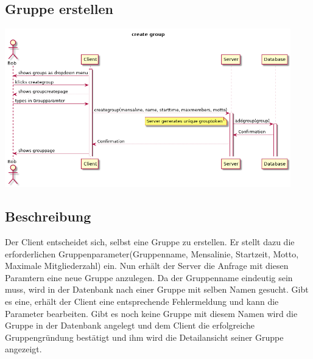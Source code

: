 \documentclass[a4paper]{scrreprt}
\begin{document}
\subsection{Gruppe erstellen}
\begin{center}
\includegraphics[width=0.93\textwidth]{Sequenzdiagramme/CreateGroup}

\end{center}
\subsection*{Beschreibung}
Der Client entscheidet sich, selbst eine Gruppe zu erstellen. Er stellt dazu die erforderlichen Gruppenparameter(Gruppenname, Mensalinie, Startzeit, Motto, Maximale Mitgliederzahl) ein. Nun erhält der Server die Anfrage mit diesen Paramtern eine neue Gruppe anzulegen. Da der Gruppenname eindeutig sein muss, wird in der Datenbank nach einer Gruppe mit selben Namen gesucht. Gibt es eine, erhält der Client eine entsprechende Fehlermeldung und kann die Parameter bearbeiten. Gibt es noch keine Gruppe mit diesem Namen wird die Gruppe in der Datenbank angelegt und dem Client die erfolgreiche Gruppengründung bestätigt und ihm wird die Detailansicht seiner Gruppe angezeigt.

\newpage
\end{document}
